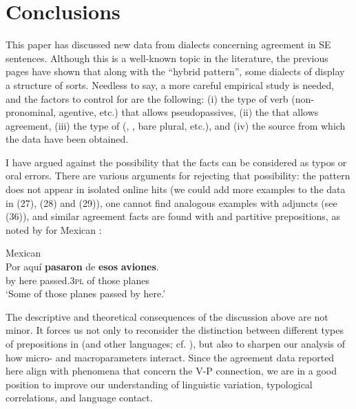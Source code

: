 \documentclass[output=paper]{langsci/langscibook}
\begin{document}
\section{Conclusions}%
This paper has discussed new data from  dialects concerning agreement in SE sentences. Although this is a well-known topic in the literature, the previous pages have shown that along with the “hybrid pattern”, some dialects of  display a  structure of sorts. Needless to say, a more careful empirical study is needed, and the factors to control for are the following: (i) the type of verb (non-pronominal, agentive, etc.) that allows pseudopassives, (ii) the  that allows agreement, (iii) the type of  (\CATDP, \CATNP, bare plural, etc.), and (iv) the source from which the data have been obtained. 

I have argued against the possibility that the facts can be considered as typos or oral errors. There are various arguments for rejecting that possibility: the pattern does not appear in isolated online hits (we could add more examples to the data in (27), (28) and (29)), one cannot find analogous examples with adjuncts (see (36)), and similar agreement facts are found with \DOM and partitive prepositions, as noted by \citet{Treviño2010} for Mexican :

 
\ea%
    Mexican \label{ex:gallego:43}\\
    \gll Por  aquí   \textbf{pasaron}      de  \textbf{esos}   \textbf{aviones}. \\
         by    here  passed.\textsc{3pl}  of  those  planes\\
    \glt ‘Some of those planes passed by here.’
\z

The descriptive and theoretical consequences of the discussion above are not minor. It forces us not only to reconsider the distinction between different types of prepositions in  (and other languages; cf. \citealt{Demonte1987,Demonte1991,Demonte1995,Abels2003,Cuervo2003,Pesetsky2004,Romero2011}), but also to sharpen our analysis of how micro- and macroparameters interact. Since the agreement data reported here align with phenomena that concern the V-P connection, we are in a good position to improve our understanding of linguistic variation, typological correlations, and language contact.
\end{document}
